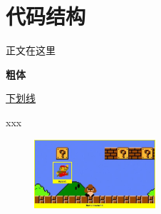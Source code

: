 \documentclass[../main.tex]{subfiles}
\begin{document}
\chapter{代码结构}

正文在这里

\textbf{粗体}

\uline{下划线}

xxx

\begin{figure}
\centering
\includegraphics[width=0.4\textwidth]{figures/agentenv.png}
\end{figure}
\end{document}
